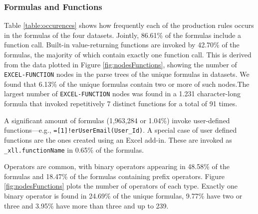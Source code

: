 \documentclass[times]{smrauth}
\begin{document}
\subsubsection{Formulas and Functions}

Table \ref{table:occurences} shows how frequently each of the production rules occurs in the formulas of the four datasets. Jointly, 86.61\% of the formulas include a function call. Built-in value-returning functions are invoked by 42.70\% of the formulas, the majority of which contain exactly one function call. This is derived from the data plotted in Figure \ref{fig:nodesFunctions}, showing the number of \texttt{EXCEL-FUNCTION} nodes in the parse trees of the unique formulas in datasets. We found that 6.13\% of the unique formulas contain two or more of such nodes.The largest number of \texttt{EXCEL-FUNCTION} nodes was found in a 1.231 character-long formula that invoked repetitively 7 distinct functions for a total of 91 times.

A significant amount of formulas (1,963,284	or 1.04\%) invoke user-defined functions---e.g., \texttt{=[1]!erUserEmail(User_Id)}. A special case of user defined functions are the ones created using an Excel add-in. These are invoked as \texttt{_xll.functionName} in 0.65\% of the formulas.

Operators are common, with binary operators appearing in 48.58\% of the formulas and 18.47\% of the formulas containing prefix operators. Figure \ref{fig:nodesFunctions} plots the number of operators of each type. Exactly one binary operator is found in 24.69\% of the unique formulas, 9.77\% have two or three and 3.95\% have more than three and up to 239.
\end{document}
